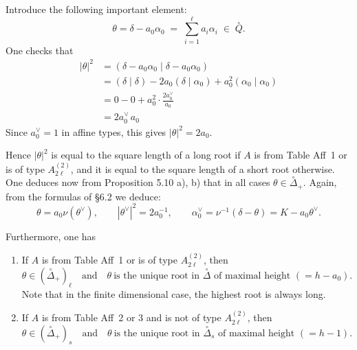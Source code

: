 \documentclass[12pt]{article}
\begin{document}
Introduce the following important element:
\[
    \theta = \delta - a_0 \alpha_0 \;=\; \sum_{i=1}^\ell a_i \alpha_i \;\in\; \overset{\circ}{Q}.
\]
One checks that
\begin{align*}
    |\theta|^2
     & =(\delta-a_0\alpha_0\mid \delta-a_0\alpha_0)                              \\
     & =(\delta\mid\delta) -2a_0(\delta\mid\alpha_0)+a_0^2(\alpha_0\mid\alpha_0) \\
     & =0-0+a_0^2\cdot \frac{2a_0^\vee}{a_0}                                     \\
     & =2a_0^\vee\,a_0
\end{align*}
Since $a_0^\vee=1$ in affine types, this gives $|\theta|^2=2a_0$.

Hence $|\theta|^2$ is equal to the square length of a long root if $A$ is from Table Aff~1 or is of type $A_{2\ell}^{(2)}$, and it is equal to the square length of a short root otherwise. One deduces now from Proposition 5.10 a), b) that in all cases
$\theta \in \overset{\circ}{\Delta}_+$. Again, from the formulas of §6.2 we deduce:
\[
    \theta = a_0 \nu(\theta^\vee),
    \qquad
    |\theta^\vee|^2 = 2a_0^{-1},
    \qquad
    \alpha_0^\vee = \nu^{-1}(\delta - \theta) = K - a_0 \theta^\vee.
\]

Furthermore, one has

\begin{proposition}[6.4]
    \leavevmode
    \begin{enumerate}[label=\alph*)]
        \item If $A$ is from Table Aff~1 or is of type $A_{2\ell}^{(2)}$, then
              \[
                  \theta \in (\overset{\circ}{\Delta}_+)_{\ell}
                  \quad \text{and} \quad
                  \theta \ \text{is the unique root in } \overset{\circ}{\Delta} \text{ of maximal height } (=h-a_0).
              \]
              Note that in the finite dimensional case, the highest root is always long.

        \item If $A$ is from Table Aff~2 or 3 and is not of type $A_{2\ell}^{(2)}$, then
              \[
                  \theta \in (\overset{\circ}{\Delta}_+)_{s}
                  \quad \text{and} \quad
                  \theta \ \text{is the unique root in } \overset{\circ}{\Delta}_s \text{ of maximal height } (=h-1).
              \]
    \end{enumerate}
\end{proposition}
\end{document}
